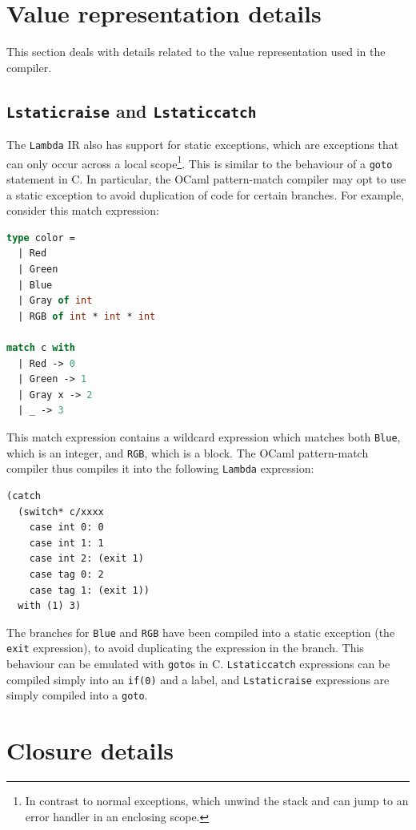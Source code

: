 \documentclass[12pt,a4paper,twoside,openright]{report}
\begin{document}
\section{Value representation details}

This section deals with details related to the value representation used in the
compiler.

\subsection{\texttt{Lstaticraise} and \texttt{Lstaticcatch}}

The \texttt{Lambda} IR also has support for static exceptions, which are
exceptions that can only occur across a local scope\footnote{In contrast to
normal exceptions, which unwind the stack and can jump to an error handler in an
enclosing scope.}. This is similar to the behaviour of a \texttt{goto} statement
in C. In particular, the OCaml pattern-match compiler may opt to use a static
exception to avoid duplication of code for certain branches. For example,
consider this match expression:

\begin{lstlisting}[language=Caml]
type color =
  | Red
  | Green
  | Blue
  | Gray of int
  | RGB of int * int * int

match c with
  | Red -> 0
  | Green -> 1
  | Gray x -> 2
  | _ -> 3
\end{lstlisting}

This match expression contains a wildcard expression which matches both 
\texttt{Blue}, which is an integer, and \texttt{RGB}, which is a block. The 
OCaml pattern-match compiler thus compiles it into the following 
\texttt{Lambda} expression:

\begin{lstlisting}
(catch
  (switch* c/xxxx
    case int 0: 0
    case int 1: 1
    case int 2: (exit 1)
    case tag 0: 2
    case tag 1: (exit 1))
  with (1) 3)
\end{lstlisting}

The branches for \texttt{Blue} and \texttt{RGB} have been compiled into a static
exception (the \texttt{exit} expression), to avoid duplicating the expression in
the branch. This behaviour can be emulated with \texttt{goto}s in C.
\texttt{Lstaticcatch} expressions can be compiled simply into an \texttt{if(0)}
and a label, and \texttt{Lstaticraise} expressions are simply compiled into a
\texttt{goto}.


\section{Closure details}
\end{document}
